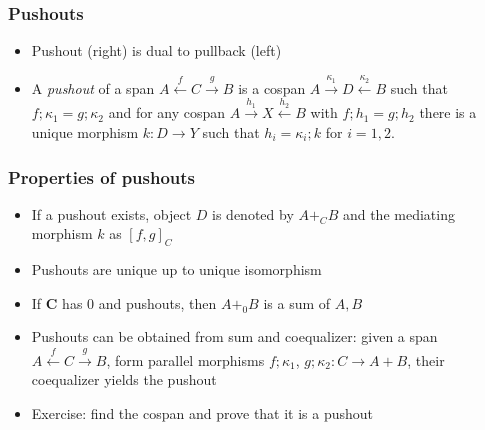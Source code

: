 \documentclass[handout]{beamer}
\newcommand{\bfsf}[1]{{\boldsymbol{#1}}}
\newcommand{\CC}{\bfsf{C}}
\begin{document}
\frame
  {   
    \frametitle{Pushouts}\label{Ch4:Push}

 \begin{itemize}[<+->]
\item Pushout (right) is dual to pullback (left)
\item A \emph{pushout} of a span
$A\stackrel{f}{\leftarrow} C \stackrel{g}{\to}B$
is a cospan $A\stackrel{\kappa_1}{\to} D \stackrel{\kappa_2}{\leftarrow}B$ such that 
$f;\kappa_1=g;\kappa_2$ and for any cospan 
$A\stackrel{h_1}{\to} X \stackrel{h_2}{\leftarrow}B$
with $f;h_1 = g;h_2$
there is a unique morphism $k: D\to Y$
such that $h_i = \kappa_i;k$ for $i=1,2$.
 \end{itemize}

 }

\frame
  {   
    \frametitle{Properties of pushouts}\label{Ch4:PushoProp}

 \begin{itemize}[<+->]
\item If a pushout exists, object $D$ is denoted by $A+_C B$ 
and the mediating morphism $k$ as $[f,g]_C$
\item Pushouts are unique up to unique isomorphism
\item If $\CC$ has 0 and pushouts, then $A+_0 B$ is a sum of $A,B$ 
\item Pushouts can be obtained from sum and coequalizer:
given a span $A\stackrel{f}{\leftarrow} C \stackrel{g}{\to}B$,
form parallel morphisms $f;\kappa_1$, $g;\kappa_2: C\to A+B$,
their coequalizer yields the pushout
\item Exercise: find the cospan and prove that it is a pushout
 \end{itemize}

 }
\end{document}

